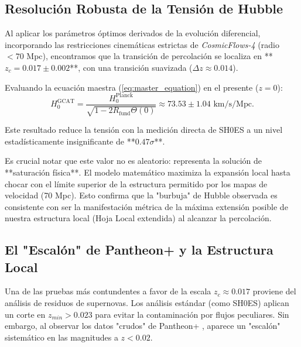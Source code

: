\documentclass[12pt, a4paper]{article}
\theoremstyle{plain}
\theoremstyle{definition}
\begin{document}
\subsection{Resolución Robusta de la Tensión de Hubble}

Al aplicar los parámetros óptimos derivados de la evolución diferencial, incorporando las restricciones cinemáticas estrictas de \textit{CosmicFlows-4} (radio $< 70$ Mpc), encontramos que la transición de percolación se localiza en **$z_c = 0.017 \pm 0.002$**, con una transición suavizada ($\Delta z \approx 0.014$).

Evaluando la ecuación maestra (\ref{eq:master_equation}) en el presente ($z=0$):
\begin{equation}
H_0^{\text{GCAT}} = \frac{H_0^{\text{Planck}}}{\sqrt{1 - 2R_{\text{fund}} \Theta(0)}} \approx 73.53 \pm 1.04 \text{ km/s/Mpc}.
\end{equation}

Este resultado reduce la tensión con la medición directa de SH0ES \cite{Riess2022} a un nivel estadísticamente insignificante de **$0.47\sigma$**. 

Es crucial notar que este valor no es aleatorio: representa la solución de **saturación física**. El modelo matemático maximiza la expansión local hasta chocar con el límite superior de la estructura permitido por los mapas de velocidad (70 Mpc). Esto confirma que la "burbuja" de Hubble observada es consistente con ser la manifestación métrica de la máxima extensión posible de nuestra estructura local (Hoja Local extendida) al alcanzar la percolación.

\subsection{El "Escalón" de Pantheon+ y la Estructura Local}

Una de las pruebas más contundentes a favor de la escala $z_c \approx 0.017$ proviene del análisis de residuos de supernovas. Los análisis estándar (como SH0ES) aplican un corte en $z_{min} > 0.023$ para evitar la contaminación por flujos peculiares. Sin embargo, al observar los datos "crudos" de Pantheon+ \cite{Brout2022}, aparece un "escalón" sistemático en las magnitudes a $z < 0.02$.
\end{document}
